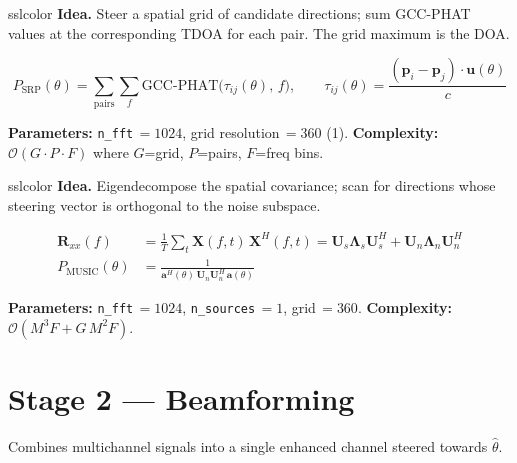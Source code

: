 \documentclass[11pt,a4paper]{article}
\begin{document}
\begin{modulebox}{sslcolor}
\textbf{Idea.} Steer a spatial grid of candidate directions; sum GCC-PHAT values at the corresponding TDOA for each pair. The grid maximum is the DOA.

\begin{equation}
P_{\text{SRP}}(\theta) = \sum_{\text{pairs}}\sum_{f} \text{GCC-PHAT}\!\big(\tau_{ij}(\theta),\,f\big),
\qquad \tau_{ij}(\theta) = \frac{(\mathbf{p}_i - \mathbf{p}_j)\cdot\mathbf{u}(\theta)}{c}
\end{equation}

\noindent\textbf{Parameters:} \texttt{n\_fft}$\,=1024$, grid resolution$\,=360$ (1\textdegree).\quad
\textbf{Complexity:} $\mathcal{O}(G \cdot P \cdot F)$ where $G$=grid, $P$=pairs, $F$=freq bins.
\end{modulebox}

\begin{modulebox}[MUSIC]{sslcolor}
\textbf{Idea.} Eigendecompose the spatial covariance; scan for directions whose steering vector is orthogonal to the noise subspace.

\begin{align}
\mathbf{R}_{xx}(f) &= \frac{1}{T}\sum_t \mathbf{X}(f,t)\,\mathbf{X}^H(f,t) = \mathbf{U}_s\boldsymbol{\Lambda}_s\mathbf{U}_s^H + \mathbf{U}_n\boldsymbol{\Lambda}_n\mathbf{U}_n^H \\[4pt]
P_{\text{MUSIC}}(\theta) &= \frac{1}{\mathbf{a}^H(\theta)\,\mathbf{U}_n\mathbf{U}_n^H\,\mathbf{a}(\theta)}
\end{align}

\noindent\textbf{Parameters:} \texttt{n\_fft}$\,=1024$, \texttt{n\_sources}$\,=1$, grid$\,=360$.\quad
\textbf{Complexity:} $\mathcal{O}(M^3 F + G\,M^2 F)$.
\end{modulebox}

\section{Stage 2 --- Beamforming}

Combines multichannel signals into a single enhanced channel steered towards $\hat{\theta}$.
\end{document}
